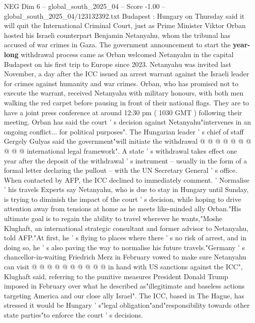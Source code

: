 \begin{textsample}{NEG Dim 6 – global\_south\_2025\_04 – Score -1.00 – global\_south\_2025\_04/123132392.txt}  \label{ex:f6_neg_208}
Budapest : Hungary on Thursday said it will quit the International Criminal Court, just as Prime Minister Viktor Orban hosted his Israeli counterpart Benjamin Netanyahu, whom the tribunal has accused of war crimes in Gaza.
The government announcement to start the \textbf{year-long} withdrawal process came as Orban welcomed Netanyahu in the capital Budapest on his first trip to Europe since 2023.
Netanyahu was invited last November, a day after the ICC issued an arrest warrant against the Israeli leader for crimes against humanity and war crimes.
Orban, who has promised not to execute the warrant, received Netanyahu with military honours, with both men walking the red carpet before pausing in front of their national flags.
They are to have a joint press conference at around 12:30 pm ( 1030 GMT ) following their meeting.
Orban has said the court ' s decision against Netanyahu"intervenes in an ongoing conflict... for political purposes".
The Hungarian leader ' s chief of staff Gergely Gulyas said the government"will initiate the withdrawal @ @ @ @ @ @ @ @ @ @ international legal framework".
A state ' s withdrawal takes effect one year after the deposit of the withdrawal ' s instrument -- usually in the form of a formal letter declaring the pullout -- with the UN Secretary General ' s office.
When contacted by AFP, the ICC declined to immediately comment. ' Normalise ' his travels Experts say Netanyahu, who is due to stay in Hungary until Sunday, is trying to diminish the impact of the court ' s decision, while hoping to drive attention away from tensions at home as he meets like-minded ally Orban."His ultimate goal is to regain the ability to travel wherever he wants,"Moshe Klughaft, an international strategic consultant and former advisor to Netanyahu, told AFP."At first, he ' s flying to places where there ' s no risk of arrest, and in doing so, he ' s also paving the way to normalise his future travels."Germany ' s chancellor-in-waiting Friedrich Merz in February vowed to make sure Netanyahu can visit @ @ @ @ @ @ @ @ @ @ in hand with US sanctions against the ICC", Klughaft said, referring to the punitive measures President Donald Trump imposed in February over what he described as"illegitimate and baseless actions targeting America and our close ally Israel".
The ICC, based in The Hague, has stressed it would be Hungary ' s"legal obligation"and"responsibility towards other state parties"to enforce the court ' s decisions.

\end{textsample}
